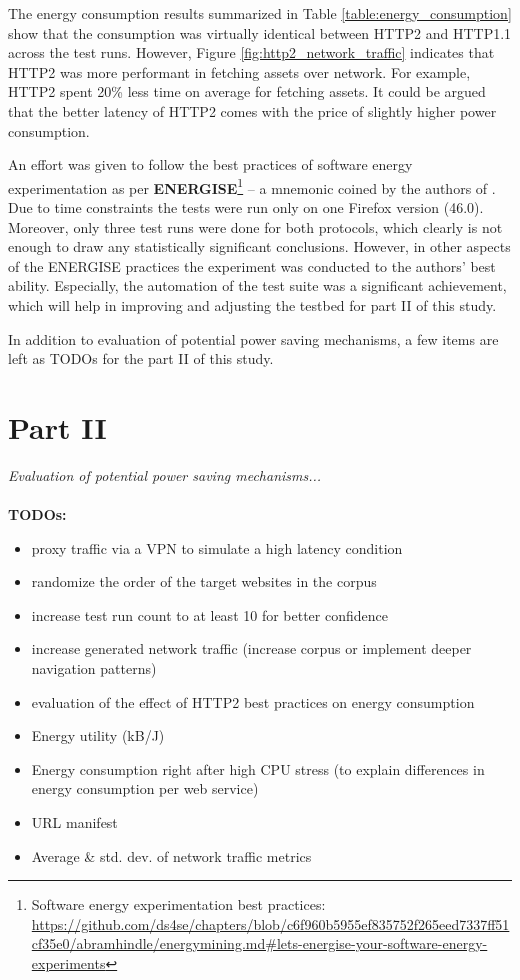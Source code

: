 \documentclass{article}
\begin{document}
The energy consumption results summarized in Table \ref{table:energy_consumption} show that the consumption was virtually identical between HTTP2 and HTTP1.1 across the test runs. However, Figure \ref{fig:http2_network_traffic} indicates that HTTP2 was more performant in fetching assets over network. For example, HTTP2 spent 20\% less time on average for fetching assets. It could be argued that the better latency of HTTP2 comes with the price of slightly higher power consumption.

An effort was given to follow the best practices of software energy experimentation as per \textbf{ENERGISE}\footnote{Software energy experimentation best practices: \url{https://github.com/ds4se/chapters/blob/c6f960b5955ef835752f265eed7337ff51cf35e0/abramhindle/energymining.md\#lets-energise-your-software-energy-experiments}} -- a mnemonic coined by the authors of \cite{greenminer}. Due to time constraints the tests were run only on one Firefox version (46.0). Moreover, only three test runs were done for both protocols, which clearly is not enough to draw any statistically significant conclusions. However, in other aspects of the ENERGISE practices the experiment was conducted to the authors' best ability. Especially, the automation of the test suite was a significant achievement, which will help in improving and adjusting the testbed for part II of this study.

In addition to evaluation of potential power saving mechanisms, a few items are left as TODOs for the part II of this study.

\section{Part II}

\emph{Evaluation of potential power saving mechanisms...}
\\ \\
\textbf{TODOs:}
\begin{itemize}
    \item proxy traffic via a VPN to simulate a high latency condition
    \item randomize the order of the target websites in the corpus
    \item increase test run count to at least 10 for better confidence
    \item increase generated network traffic (increase corpus or implement deeper navigation patterns)
    \item evaluation of the effect of HTTP2 best practices on energy consumption
    \item Energy utility (kB/J)
    \item Energy consumption right after high CPU stress (to explain differences in energy consumption per web service)
    \item URL manifest
    \item Average \& std. dev. of network traffic metrics
\end{itemize}
\clearpage
\end{document}
